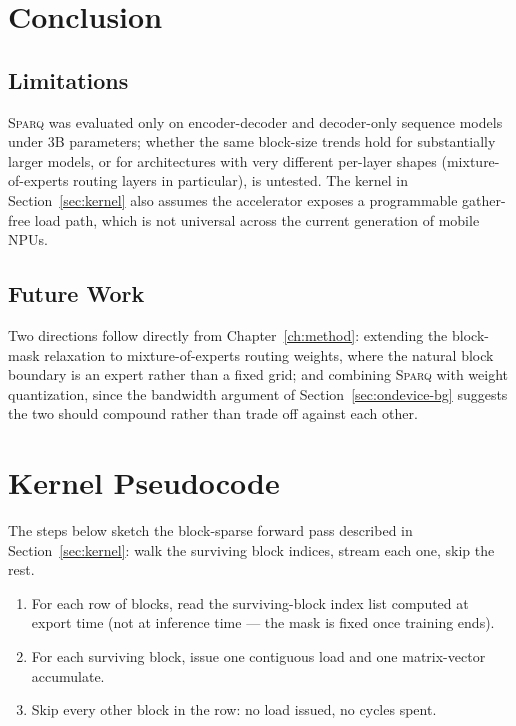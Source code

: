\documentclass[11pt,twoside]{book}
\newcommand{\model}{\textsc{Sparq}\xspace}
\begin{document}
\chapter{Conclusion}
\label{ch:conclusion}

\section{Limitations}
\label{sec:limitations}

\model{} was evaluated only on encoder-decoder and decoder-only sequence
models under 3B parameters; whether the same block-size trends hold for
substantially larger models, or for architectures with very different
per-layer shapes (mixture-of-experts routing layers in particular), is
untested. The kernel in Section~\ref{sec:kernel} also assumes the
accelerator exposes a programmable gather-free load path, which is not
universal across the current generation of mobile NPUs.

\section{Future Work}
\label{sec:future}

Two directions follow directly from Chapter~\ref{ch:method}: extending
the block-mask relaxation to mixture-of-experts routing weights, where
the natural block boundary is an expert rather than a fixed grid; and
combining \model{} with weight quantization, since the bandwidth argument
of Section~\ref{sec:ondevice-bg} suggests the two should compound rather
than trade off against each other.

\backmatter




\appendix

\chapter{Kernel Pseudocode}
\label{app:kernel}

The steps below sketch the block-sparse forward pass described in
Section~\ref{sec:kernel}: walk the surviving block indices, stream each
one, skip the rest.

\begin{enumerate}
  \item For each row of blocks, read the surviving-block index list
    computed at export time (not at inference time --- the mask is fixed
    once training ends).
  \item For each surviving block, issue one contiguous load and one
    matrix-vector accumulate.
  \item Skip every other block in the row: no load issued, no cycles
    spent.
\end{enumerate}
\end{document}
